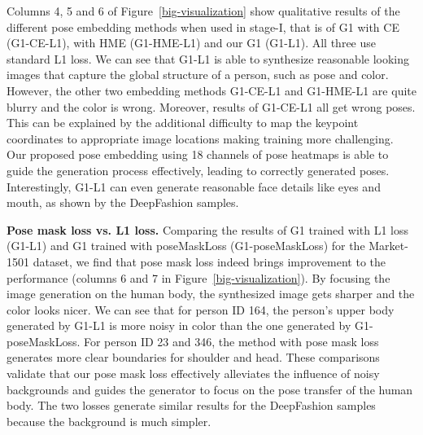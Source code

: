 \documentclass{article}
\newcommand{\myparagraph}[1]{\vspace{0.0em}\noindent\textbf{#1}}
\begin{document}
Columns 4, 5 and 6 of Figure~\ref{big-visualization} show qualitative results of the different pose embedding methods when used in stage-I, that is of G1 with CE (G1-CE-L1), with HME (G1-HME-L1) and our G1 (G1-L1).
All three use standard L1 loss. We can see that G1-L1 is able to synthesize reasonable looking images that capture the global structure of a person, such as pose and color. However, the other two embedding methods G1-CE-L1 and G1-HME-L1 are quite blurry and the color is wrong. Moreover, results of G1-CE-L1 all get wrong poses. This can be explained by the additional difficulty to map the keypoint coordinates to appropriate image locations making training more challenging. 
Our proposed pose embedding using 18 channels of pose heatmaps is able to guide the generation process effectively, leading to correctly generated poses. 
Interestingly, G1-L1 can even generate reasonable face details like eyes and mouth, as shown by the DeepFashion samples.


\myparagraph{Pose mask loss vs. L1 loss.} 
Comparing the results of G1 trained with L1 loss (G1-L1) and G1 trained with poseMaskLoss (G1-poseMaskLoss) for the Market-1501 dataset, we find that pose mask loss indeed brings improvement to the performance (columns 6 and 7 in Figure~\ref{big-visualization}).
By focusing the image generation on the human body, the synthesized image gets sharper and the color looks nicer. 
We can see that for person ID 164, the person's upper body generated by G1-L1 is more noisy in color than the one generated by G1-poseMaskLoss. For person ID 23 and 346, the method with pose mask loss generates more clear boundaries for shoulder and head.
These comparisons validate that our pose mask loss effectively alleviates the influence of noisy backgrounds and guides the generator to focus on the pose transfer of the human body.
The two losses generate similar results for the DeepFashion samples because the background is much simpler. 
\end{document}
